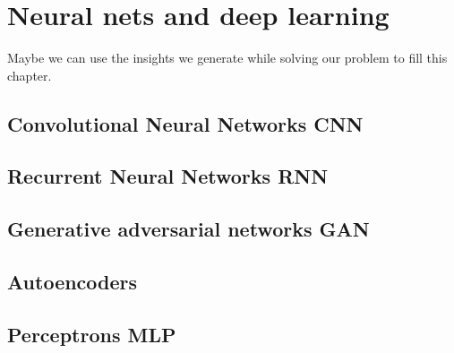 \section{Neural nets and deep learning}
Maybe we can use the insights we generate while solving our problem to fill this chapter.



\subsection{Convolutional Neural Networks CNN}



\subsection{Recurrent Neural Networks RNN}


\subsection{Generative adversarial networks GAN}


\subsection{Autoencoders}



\subsection{Perceptrons MLP}




\newpage